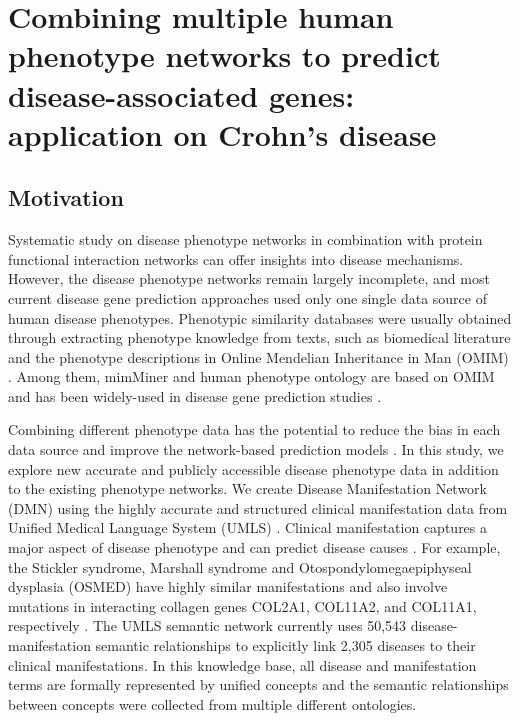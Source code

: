 \chapter{Combining multiple human phenotype networks to predict disease-associated genes: application on Crohn's disease}\label{phenotype}
\section{Motivation}

Systematic study on disease phenotype networks in combination
with protein functional interaction networks can offer insights into
disease mechanisms.
However, the disease phenotype networks remain largely incomplete, and
most current disease gene prediction
approaches \cite{lage2007human,li2010genome,wu2008network,wu2009align,vanunu2010associating,hwang2012co}
used only one single data source of human disease phenotypes.
Phenotypic similarity databases were usually obtained through
extracting phenotype knowledge from texts,
such as biomedical literature \cite{korbel2005systematic} and
the phenotype descriptions in Online Mendelian
Inheritance in Man (OMIM) \cite{van2006text,lage2007human, robinson2008human}.
Among them, mimMiner \cite{van2006text} and human phenotype
ontology \cite{robinson2008human} are based on OMIM and
has been widely-used in disease gene prediction
studies \cite{li2010genome,vanunu2010associating,hwang2012co,natarajan2014inductive,hoehndorf2011phenomenet}.


Combining different phenotype data has the potential to reduce the bias in each data source
and improve the network-based prediction models \cite{mestres2008data, oti2009biological}.
In this study, we explore new accurate and publicly accessible disease phenotype data in addition to the existing phenotype networks.
We create Disease Manifestation Network (DMN)
using the highly accurate and structured clinical manifestation data from
Unified Medical Language System (UMLS) \cite{lindberg1993unified, bodenreider2004unified, mccray2003upper}.
Clinical manifestation captures a major aspect of disease phenotype and can predict disease causes \cite{brunner2004syndrome}.
For example, the Stickler syndrome, Marshall syndrome and Otospondylomegaepiphyseal dysplasia (OSMED)
have highly similar manifestations and also involve mutations in interacting collagen genes COL2A1, COL11A2, and COL11A1, respectively \cite{annunen1999splicing}.
The UMLS semantic network currently uses 50,543 disease-manifestation semantic relationships to explicitly link 2,305 diseases to their clinical manifestations.
In this knowledge base, all disease and manifestation terms are formally represented by unified concepts
and the semantic relationships between concepts were collected from multiple different ontologies.


